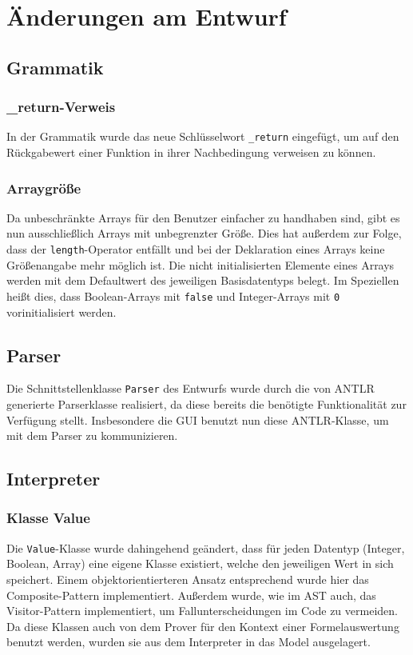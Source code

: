 \section{Änderungen am Entwurf}
\subsection{Grammatik}
\subsubsection{\_return-Verweis}
In der Grammatik wurde das neue Schlüsselwort \texttt{\_return} eingefügt, um auf den Rückgabewert einer Funktion in ihrer Nachbedingung verweisen zu können.
\subsubsection{Arraygröße}
Da unbeschränkte Arrays für den Benutzer einfacher zu handhaben sind, gibt es nun ausschließlich Arrays mit unbegrenzter Größe. Dies hat außerdem zur Folge, dass der \texttt{length}-Operator entfällt und bei der Deklaration eines Arrays keine Größenangabe mehr möglich ist. Die nicht initialisierten Elemente eines Arrays werden mit dem Defaultwert des jeweiligen Basisdatentyps belegt. Im Speziellen heißt dies, dass Boolean-Arrays mit \texttt{false} und Integer-Arrays mit \texttt{0} vorinitialisiert werden.

\subsection{Parser\label{aenderung_parser}}
Die Schnittstellenklasse \texttt{Parser} des Entwurfs wurde durch die von ANTLR generierte Parserklasse realisiert, da diese bereits die benötigte Funktionalität zur Verfügung stellt. Insbesondere die GUI benutzt nun diese ANTLR-Klasse, um mit dem Parser zu kommunizieren.

\subsection{Interpreter}
\subsubsection{Klasse Value}
Die \texttt{Value}-Klasse wurde dahingehend geändert, dass für jeden Datentyp (Integer, Boolean, Array) eine eigene Klasse existiert, welche den jeweiligen Wert in sich speichert. Einem objektorientierteren Ansatz entsprechend wurde hier das Composite-Pattern implementiert. Außerdem wurde, wie im AST auch, das Visitor-Pattern implementiert, um Fallunterscheidungen im Code zu vermeiden. Da diese Klassen auch von dem Prover für den Kontext einer Formelauswertung benutzt werden, wurden sie aus dem Interpreter in das Model ausgelagert.


